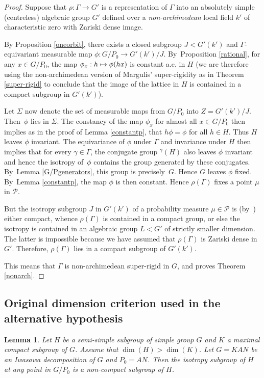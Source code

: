 \documentclass[10pt,a4paper]{amsart}
\def\mto{\mathchoice{\longmapsto}{\mapsto}{\mapsto}{\mapsto}}
\newtheorem{lemma}{Lemma}
\theoremstyle{definition}
\let\g\gamma
\let\G\Gamma
\begin{document}
\begin{proof} Suppose that $\rho :\Gamma \to G'$ is a representation of $\Gamma $ into an absolutely simple (centreless) algebraic group $G'$ defined over a \emph{non-archimedean} local field $k'$ of characteristic zero with Zariski dense image.

By Proposition \ref{oneorbit}, there exists a closed subgroup $J< G'(k')$ and $\G$-equivariant measurable map $\phi : G/P_0\to G'(k')/J$. By~Proposition \ref{rational}, for any $x\in G/P_0$, the map $\phi_x: h\mto \phi(hx)$ is constant a.e. in $H$ (we are therefore using the non-archimedean version of Margulis' super-rigidity as in Theorem \ref{super-rigid} to conclude that the
image of the lattice in $H$ is contained in a compact subgroup in $G'(k')$).

Let $\Sigma $ now denote the set of measurable maps from $G/P_0$ into $Z=G'(k')/J$. Then~$\phi $ lies in $\Sigma$. The constancy of the map $\phi_x$ for almost all $x\in G/P_0$ then implies as in the proof of Lemma \ref{constantp}, that $h\phi =\phi$ for all $h\in H$. Thus $H$ leaves $\phi $ invariant. The equivariance of $\phi $ under $\G$ and invariance under $H$ then implies that for every $\g \in \G$, the conjugate group $^{\g} (H)$ also leaves $\phi $ invariant and hence the isotropy of~$\phi$ contains the group generated by these conjugates. By~Lemma \ref{G/Pgenerators}, this group is precisely~$G$. Hence $G$ leaves $\phi $ fixed. By~Lemma \ref{constantp}, the map $\phi $ is then constant. Hence $\rho (\Gamma)$ fixes a point $\mu $ in ${\mathcal P}$.

But the isotropy subgroup $J$ in $G'(k')$ of a probability measure $\mu\in {\mathcal P}$ is (by~\cite[Cor.\,(3.2.19)]{Z})
either compact, whence $\rho (\G)$ is contained in a compact group, or else the isotropy is contained in an algebraic group $L < G'$ of strictly smaller dimension. The latter is impossible because we have assumed that $\rho (\G)$ is Zariski dense in $G'$. Therefore, $\rho (\G)$ lies in a compact subgroup of $G'(k')$.

This means that $\Gamma $ is non-archimedean super-rigid in $G$, and proves Theorem \ref{nonarch}.
\end{proof}

\subsection{Original dimension criterion used in the alternative hypothesis}
\setcounter{lemma}{10}
\begin{lemma}\label{trick} Let $H$ be a semi-simple subgroup of simple
group $G$ and $K$ a maximal compact subgroup of $G$. Assume that
$\dim(H)>\dim(K)$. Let $G=KAN$ be an Iwasawa decomposition of $G$ and
$P_0=AN$. Then the isotropy subgroup of $H$ at any point in $G/P_0$ is
a non-compact subgroup of $H$.
\end{lemma}
\end{document}
